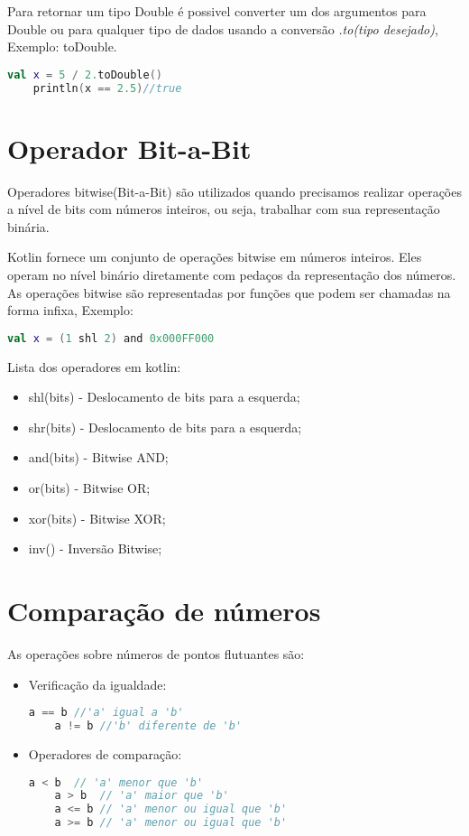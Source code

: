     Para retornar um tipo Double é possivel converter um dos argumentos para
    Double ou para qualquer tipo de dados usando a conversão \emph{.to(tipo desejado)}, Exemplo: toDouble.
    \begin{lstlisting}[label={lst:example1}, language=Kotlin]
    val x = 5 / 2.toDouble()
    println(x == 2.5)//true
    \end{lstlisting}

\section{Operador Bit-a-Bit}

Operadores bitwise(Bit-a-Bit) são utilizados quando precisamos realizar operações 
a nível de bits com números inteiros, ou seja, trabalhar com sua 
representação binária.

Kotlin fornece um conjunto de operações bitwise em números inteiros.
Eles operam no nível binário diretamente com pedaços da representação 
dos números. As operações bitwise são representadas por funções que 
podem ser chamadas na forma infixa, Exemplo:
\begin{lstlisting}[label={lst:example1}, language=Kotlin]
  val x = (1 shl 2) and 0x000FF000
\end{lstlisting}

Lista dos operadores em kotlin:

\begin{itemize}
	\item shl(bits) - Deslocamento de bits para a esquerda;
	\item shr(bits) - Deslocamento de bits para a esquerda;
	\item and(bits) - Bitwise AND;
	\item or(bits)  - Bitwise OR;
	\item xor(bits) - Bitwise XOR;
	\item inv()     - Inversão Bitwise;
\end{itemize}

\section{Comparação de números}

As operações sobre números de pontos flutuantes são:


\begin{itemize}
\item
  Verificação da igualdade:  
  \begin{lstlisting}[label={lst:example1}, language=Kotlin]
    a == b //'a' igual a 'b'
    a != b //'b' diferente de 'b'
  \end{lstlisting}

  \item
  Operadores de comparação:  
  \begin{lstlisting}[label={lst:example1}, language=Kotlin]
    a < b  // 'a' menor que 'b' 
    a > b  // 'a' maior que 'b'
    a <= b // 'a' menor ou igual que 'b'
    a >= b // 'a' menor ou igual que 'b'
  \end{lstlisting}
\end{itemize}
